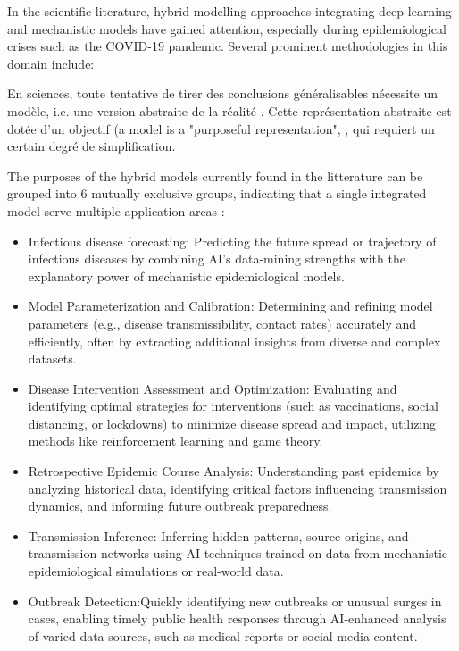 In the scientific literature, hybrid modelling approaches integrating deep learning and mechanistic models have gained attention, especially during epidemiological crises such as the COVID-19 pandemic. Several prominent methodologies in this domain include:

En sciences, toute tentative de tirer des conclusions généralisables nécessite un
modèle, i.e. une version abstraite de la réalité \cite{McCallum2008}. Cette représentation
abstraite est dotée d’un objectif (a model is a "purposeful representation", 
\cite{Starfield1990}, qui requiert un certain degré de simplification.

The purposes of the hybrid models currently found in the litterature can be grouped into 6 mutually exclusive groups, indicating that a single integrated model serve multiple application areas \cite{Ye2025} :
\begin{itemize}
    \item Infectious disease forecasting: Predicting the future spread or trajectory of infectious diseases by combining AI's data-mining strengths with the explanatory power of mechanistic epidemiological models. 
    \item Model Parameterization and Calibration: Determining and refining model parameters (e.g., disease transmissibility, contact rates) accurately and efficiently, often by extracting additional insights from diverse and complex datasets.
    \item Disease Intervention Assessment and Optimization: Evaluating and identifying optimal strategies for interventions (such as vaccinations, social distancing, or lockdowns) to minimize disease spread and impact, utilizing methods like reinforcement learning and game theory. 
    \item Retrospective Epidemic Course Analysis: Understanding past epidemics by analyzing historical data, identifying critical factors influencing transmission dynamics, and informing future outbreak preparedness.
    \item Transmission Inference: Inferring hidden patterns, source origins, and transmission networks using AI techniques trained on data from mechanistic epidemiological simulations or real-world data.
    \item Outbreak Detection:Quickly identifying new outbreaks or unusual surges in cases, enabling timely public health responses through AI-enhanced analysis of varied data sources, such as medical reports or social media content.
\end{itemize}


